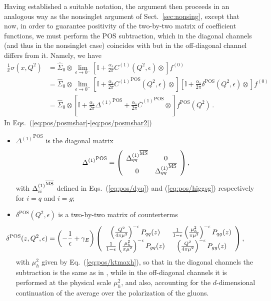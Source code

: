 Having established a suitable notation, the argument then proceeds
in an analogous way as the nonsinglet argument of
Sect.~\ref{sec:nonsing}, except that now, in order to guarantee
positivity of the two-by-two matrix of coefficient functions, we must
perform the POS subtraction, which in the diagonal
channels (and thus in the nonsinglet case) coincides with \msbar{} but
in the off-diagonal channel differs from it.
Namely, we have
\begin{align}
\frac{1}{x} \sigma(x,Q^2)&= \hat \Sigma_0\otimes
\lim_{\epsilon\to
  0^-}\left[\mathbb{I}
    +\frac{\alpha_s}{2\pi} C^{(1)}(Q^2,\epsilon) \otimes\right]
    f^{(0)} \label{eq:pos/posmsbar} \\
&= \hat \Sigma_0\otimes
\lim_{\epsilon\to
  0^-}\left[\mathbb{I}
  +\frac{\alpha_s}{2\pi} {C^{(1)}}^{{\textrm{POS}}}(Q^2,\epsilon) \otimes\right]
\left[\mathbb{I}
    +\frac{\alpha_s}{2\pi} \delta^{{\textrm{POS}}} (Q^2,\epsilon)\otimes\right]
    f^{(0)} \label{eq:pos/posmsbar1} \\
    &=  \hat \Sigma_0\otimes
\left[\mathbb{I}+ \frac{\alpha_s}{2\pi} {\Delta^{(1)}}^{{\textrm{POS}}}
  +\frac{\alpha_s}{2\pi}    {\overline{C}^{(1)}}^{{\textrm{POS}}} \otimes
  \right] 
     f^{{\textrm{POS}}}(Q^2) \,. \label{eq:pos/posmsbar2}
\end{align}
In Eqs.~(\ref{eq:pos/posmsbar}-\ref{eq:pos/posmsbar2})\begin{itemize}
\item $ {\Delta^{(1)}}^{{\textrm{POS}}}$ is the diagonal matrix
\begin{equation}\label{eq:pos/Deltamat}
  {\Delta^{(1)}}^{{\textrm{POS}}}=\left(\begin{array}{cc} {\Delta_{qq}^{(1)}}^{{\overline{\textrm{MS}}}} &
   0 \\0 & {\Delta_{gg}^{(1)}}^{{\overline{\textrm{MS}}}} \end{array}\right),
\end{equation}
with  ${\Delta_{ii}^{(1)}}^{{\overline{\textrm{MS}}}}$ defined in Eqs.~(\ref{eq:pos/dyq}) and
(\ref{eq:pos/higgsg}) respectively for $i=q$ and $i=g$;
\item $\delta^{{\textrm{POS}}} (Q^2,\epsilon)$ is a two-by-two matrix of
  counterterms
\begin{equation}\label{eq:pos/deltamat}
 \hspace*{-3em}\delta^{{\textrm{POS}}} (z,Q^2,\epsilon)= \left(-\frac 1
    {\epsilon}+\gamma_E\right) \left(\begin{array}{cc}  \left(\frac{Q^2}{4\pi
      \mu^2}\right)^{-\epsilon} P_{qq}(z) & \frac{1}{1-\epsilon}\left(\frac{\mu_h^2}{\pi\mu^2}\right)^{-\epsilon} 
  P_{qg}(z)   \\\frac{1}{1-\epsilon}\left(\frac{\mu_h^2}{\pi\mu^2}\right)^{-\epsilon} P_{gq}(z)  & \left(\frac{Q^2}{4\pi
      \mu^2}\right)^{-\epsilon} P_{gg}(z)  \end{array}\right),
\end{equation}
with $\mu_h^2$ given by  Eq.~(\ref{eq:pos/ktmaxh}), so that in the
diagonal channels the subtraction is the same as in \msbar{}, while in
the off-diagonal channels it is performed at the physical scale
$\mu_h^2$, and also, accounting for the $d$-dimensional continuation of
the  average over the polarization of the gluons.
  \end{itemize}

